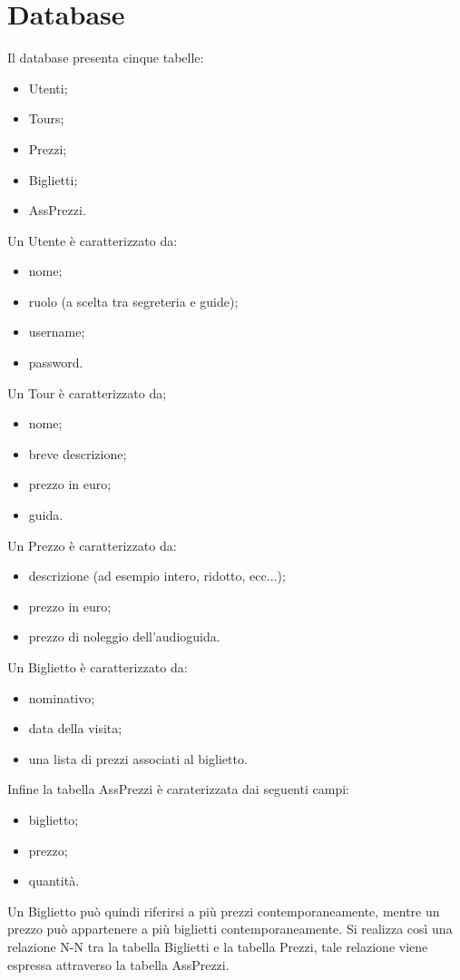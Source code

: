 \documentclass[10pt,a4paper,onecolumn]{article}
\begin{document}
\section{Database}
Il database presenta cinque tabelle:
 \begin{itemize}
     \item Utenti;
     \item Tours;
     \item Prezzi;
     \item Biglietti;
     \item AssPrezzi.
 \end{itemize}
Un Utente è caratterizzato da:
\begin{itemize}
    \item nome;
    \item ruolo (a scelta tra segreteria e guide);
    \item username;
    \item password.
\end{itemize}
Un Tour è caratterizzato da;
\begin{itemize}
    \item nome;
    \item breve descrizione;
    \item prezzo in euro;
    \item guida.
\end{itemize}
Un Prezzo è caratterizzato da:
\begin{itemize}
    \item descrizione (ad esempio intero, ridotto, ecc...);
    \item prezzo in euro;
    \item prezzo di noleggio dell'audioguida.
\end{itemize}
Un Biglietto è caratterizzato da:
\begin{itemize}
    \item nominativo;
    \item data della visita;
    \item una lista di prezzi associati al biglietto.
\end{itemize}
Infine la tabella AssPrezzi è caraterizzata dai seguenti campi:
\begin{itemize}
    \item biglietto;
    \item prezzo;
    \item quantità.
\end{itemize}
Un Biglietto può quindi riferirsi a più prezzi contemporaneamente, mentre un prezzo può appartenere a più biglietti contemporaneamente. Si realizza così una relazione N-N tra la tabella Biglietti e la tabella Prezzi, tale relazione viene espressa attraverso la tabella AssPrezzi.\\
\end{document}
